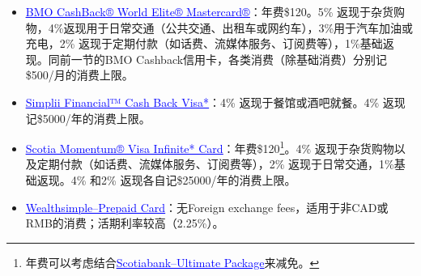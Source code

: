 \documentclass{article}
\begin{document}
\begin{itemize}
    \item \hyperref{https://www.bmo.com/main/personal/credit-cards/bmo-cashback-world-elite-mastercard/}{}{}{\textcolor{blue}{\underline{BMO CashBack® World Elite® Mastercard®}}}：年费\$120。5\% 返现于杂货购物，4\%返现用于日常交通（公共交通、出租车或网约车），3\%用于汽车加油或充电，2\% 返现于定期付款（如话费、流媒体服务、订阅费等），1\%基础返现。同前一节的BMO Cashback信用卡，各类消费（除基础消费）分别记\$500/月的消费上限。
    \item \hyperref{https://www.simplii.com/en/credit-cards/cash-back-visa.html}{}{}{\textcolor{blue}{\underline{Simplii Financial™ Cash Back Visa*}}}：4\% 返现于餐馆或酒吧就餐。4\% 返现记\$5000/年的消费上限。
    \item \hyperref{https://www.scotiabank.com/ca/en/personal/credit-cards/visa/momentum-infinite-card.html}{}{}{\textcolor{blue}{\underline{Scotia Momentum® Visa Infinite* Card}}}：年费\$120\footnote{年费可以考虑结合\hyperref{https://www.scotiabank.com/ca/en/personal/bank-accounts/chequing-accounts/ultimate-package.html}{}{}{\textcolor{blue}{\underline{Scotiabank–Ultimate Package}}}来减免。}。4\% 返现于杂货购物以及定期付款（如话费、流媒体服务、订阅费等），2\% 返现于日常交通，1\%基础返现。4\% 和2\% 返现各自记\$25000/年的消费上限。
    \item \hyperref{https://www.wealthsimple.com/en-ca}{}{}{\textcolor{blue}{\underline{Wealthsimple–Prepaid Card}}}：无Foreign exchange fees，适用于非CAD或RMB的消费；活期利率较高（2.25\%）。
\end{itemize}

% 
% 
\end{document}
